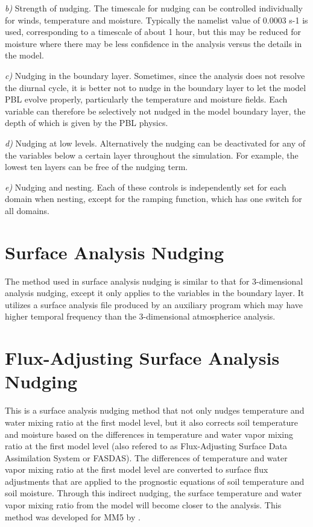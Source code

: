 {\it b)} Strength of nudging. The timescale for nudging can be controlled individually for winds, temperature and moisture. Typically the namelist value of  0.0003 s-1 is used, corresponding to a timescale of about 1 hour, but this may be reduced for moisture where there may be less confidence in the analysis versus the details in the model.

{\it c)} Nudging in the boundary layer. Sometimes, since the analysis does not resolve the diurnal cycle, it is better not to nudge in the boundary layer to let the model PBL evolve properly, particularly the temperature and moisture fields. Each variable can therefore be selectively not nudged in the model boundary layer, the depth of which is given by the PBL physics.

{\it d)} Nudging at low levels. Alternatively the nudging can be deactivated for any of the variables below a certain layer throughout the simulation. For example, the lowest ten layers can be free of the nudging term. 

{\it e)} Nudging and nesting. Each of these controls is independently set for each domain when nesting, except for the ramping function, which has one switch for all domains.

\section{Surface Analysis Nudging}

The method used in surface analysis nudging is similar to that for 3-dimensional analysis nudging, except it only applies to the variables in the boundary layer. It utilizes a surface analysis file produced by an auxiliary program which may have higher temporal frequency than the 3-dimensional atmospherice analysis. 

\section{Flux-Adjusting Surface Analysis Nudging}

This is a surface analysis nudging method that not only nudges temperature and water mixing ratio at the first model level, but it also corrects soil temperature and moisture based on the differences in temperature and water vapor mixing ratio at the first model level (also refered to as Flux-Adjusting Surface Data Assimilation System or FASDAS). The differences of temperature and water vapor mixing ratio at the first model level are converted to surface flux adjustments that are applied to the prognostic equations of soil temperature and soil moisture. Through this indirect nudging, the surface temperature and water vapor mixing ratio from the model will become closer to the analysis. This method was developed for MM5 by \citet{alapaty08}.

